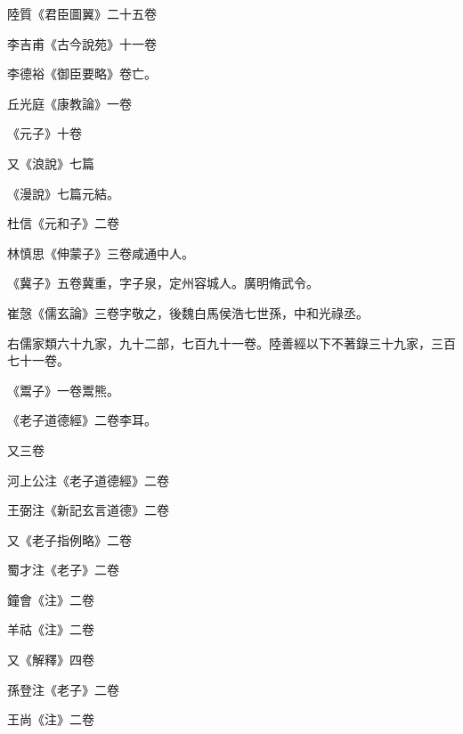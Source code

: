 \begin{pinyinscope}
 陸質《君臣圖翼》二十五卷



 李吉甫《古今說苑》十一卷



 李德裕《御臣要略》卷亡。



 丘光庭《康教論》一卷



 《元子》十卷



 又《浪說》七篇



 《漫說》七篇元結。



 杜信《元和子》二卷



 林慎思《伸蒙子》三卷咸通中人。



 《冀子》五卷冀重，字子泉，定州容城人。廣明脩武令。



 崔愨《儒玄論》三卷字敬之，後魏白馬侯浩七世孫，中和光祿丞。



 右儒家類六十九家，九十二部，七百九十一卷。陸善經以下不著錄三十九家，三百七十一卷。



 《鬻子》一卷鬻熊。



 《老子道德經》二卷李耳。



 又三卷



 河上公注《老子道德經》二卷



 王弼注《新記玄言道德》二卷



 又《老子指例略》二卷



 蜀才注《老子》二卷



 鐘會《注》二卷



 羊祜《注》二卷



 又《解釋》四卷



 孫登注《老子》二卷



 王尚《注》二卷




\end{pinyinscope}
